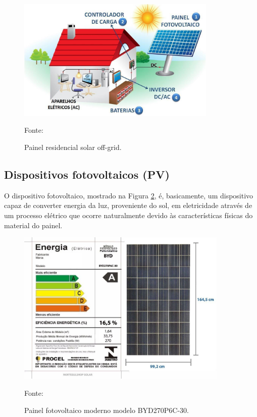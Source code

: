 \begin{figure}[H]
    \centering
    \includegraphics[width=0.85\textwidth]{./Figuras/sistema_pv_rede_off.jpg}
    \caption{Painel residencial solar off-grid.}{Fonte: \cite{neosolar}}
   \label{fig:sistema_pv_rede_off}
\end{figure}

\subsection{Dispositivos fotovoltaicos (PV)}

O dispositivo fotovoltaico, mostrado na Figura \ref{fig:BYD270P6C}, é, basicamente, um dispositivo capaz de converter energia da luz, proveniente do sol, em eletricidade através de um processo elétrico que ocorre naturalmente devido às características físicas do material do painel.

\begin{figure}[H]
    \centering
    \includegraphics[width=0.9\textwidth]{./Figuras/BYD270P6C.jpg}
    \caption{Painel fotovoltaico moderno modelo BYD270P6C-30.}{Fonte: \cite{nortesulshop}}
   \label{fig:BYD270P6C}
\end{figure}

